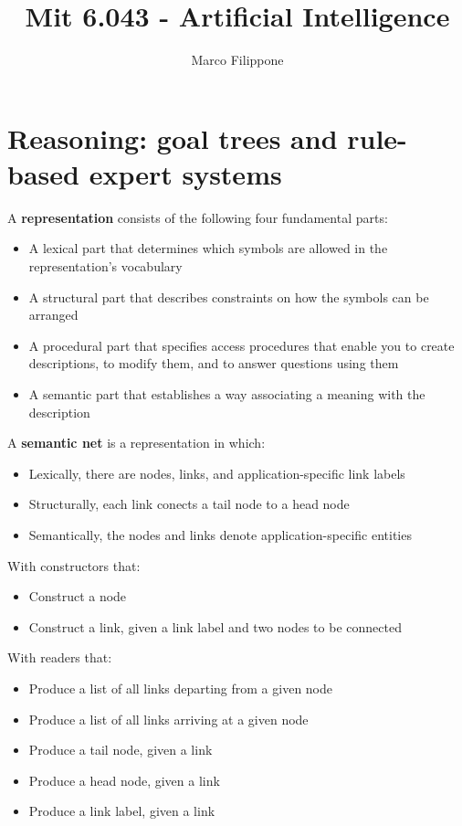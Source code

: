 \documentclass{article}
\begin{document}
\title{Mit 6.043 - Artificial Intelligence}
\author{Marco Filippone}
\maketitle

\section{Reasoning: goal trees and rule-based expert systems}

A \textbf{representation} consists of the following four
fundamental parts:
\begin{itemize}
  \item A lexical part that determines which symbols are allowed
    in the representation's vocabulary
  \item A structural part that describes constraints on how the
    symbols can be arranged
  \item A procedural part that specifies access procedures that
    enable you to create descriptions, to modify them, and to
    answer questions using them
  \item A semantic part that establishes a way associating a
    meaning with the description
\end{itemize}

A \textbf{semantic net} is a representation in which:
\begin{itemize}
  \item Lexically, there are nodes, links, and application-specific link labels
  \item Structurally, each link conects a tail node to a head node
  \item Semantically, the nodes and links denote application-specific entities
\end{itemize}
With constructors that:
\begin{itemize}
  \item Construct a node
  \item Construct a link, given a link label and two nodes to be connected
\end{itemize}
With readers that:
\begin{itemize}
  \item Produce a list of all links departing from a given node
  \item Produce a list of all links arriving at a given node
  \item Produce a tail node, given a link
  \item Produce a head node, given a link
  \item Produce a link label, given a link
\end{itemize}
\end{document}
